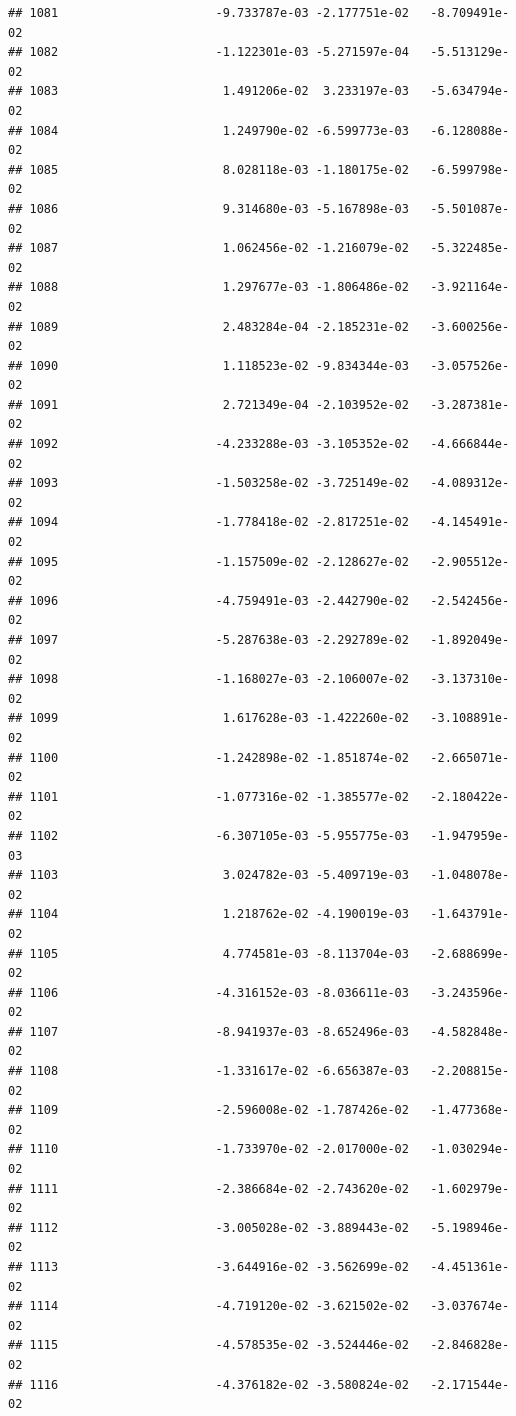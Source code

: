 \documentclass[
]{article}
\begin{document}
\begin{verbatim}
## 1081                      -9.733787e-03 -2.177751e-02   -8.709491e-02
## 1082                      -1.122301e-03 -5.271597e-04   -5.513129e-02
## 1083                       1.491206e-02  3.233197e-03   -5.634794e-02
## 1084                       1.249790e-02 -6.599773e-03   -6.128088e-02
## 1085                       8.028118e-03 -1.180175e-02   -6.599798e-02
## 1086                       9.314680e-03 -5.167898e-03   -5.501087e-02
## 1087                       1.062456e-02 -1.216079e-02   -5.322485e-02
## 1088                       1.297677e-03 -1.806486e-02   -3.921164e-02
## 1089                       2.483284e-04 -2.185231e-02   -3.600256e-02
## 1090                       1.118523e-02 -9.834344e-03   -3.057526e-02
## 1091                       2.721349e-04 -2.103952e-02   -3.287381e-02
## 1092                      -4.233288e-03 -3.105352e-02   -4.666844e-02
## 1093                      -1.503258e-02 -3.725149e-02   -4.089312e-02
## 1094                      -1.778418e-02 -2.817251e-02   -4.145491e-02
## 1095                      -1.157509e-02 -2.128627e-02   -2.905512e-02
## 1096                      -4.759491e-03 -2.442790e-02   -2.542456e-02
## 1097                      -5.287638e-03 -2.292789e-02   -1.892049e-02
## 1098                      -1.168027e-03 -2.106007e-02   -3.137310e-02
## 1099                       1.617628e-03 -1.422260e-02   -3.108891e-02
## 1100                      -1.242898e-02 -1.851874e-02   -2.665071e-02
## 1101                      -1.077316e-02 -1.385577e-02   -2.180422e-02
## 1102                      -6.307105e-03 -5.955775e-03   -1.947959e-03
## 1103                       3.024782e-03 -5.409719e-03   -1.048078e-02
## 1104                       1.218762e-02 -4.190019e-03   -1.643791e-02
## 1105                       4.774581e-03 -8.113704e-03   -2.688699e-02
## 1106                      -4.316152e-03 -8.036611e-03   -3.243596e-02
## 1107                      -8.941937e-03 -8.652496e-03   -4.582848e-02
## 1108                      -1.331617e-02 -6.656387e-03   -2.208815e-02
## 1109                      -2.596008e-02 -1.787426e-02   -1.477368e-02
## 1110                      -1.733970e-02 -2.017000e-02   -1.030294e-02
## 1111                      -2.386684e-02 -2.743620e-02   -1.602979e-02
## 1112                      -3.005028e-02 -3.889443e-02   -5.198946e-02
## 1113                      -3.644916e-02 -3.562699e-02   -4.451361e-02
## 1114                      -4.719120e-02 -3.621502e-02   -3.037674e-02
## 1115                      -4.578535e-02 -3.524446e-02   -2.846828e-02
## 1116                      -4.376182e-02 -3.580824e-02   -2.171544e-02

\end{verbatim}
\end{document}
